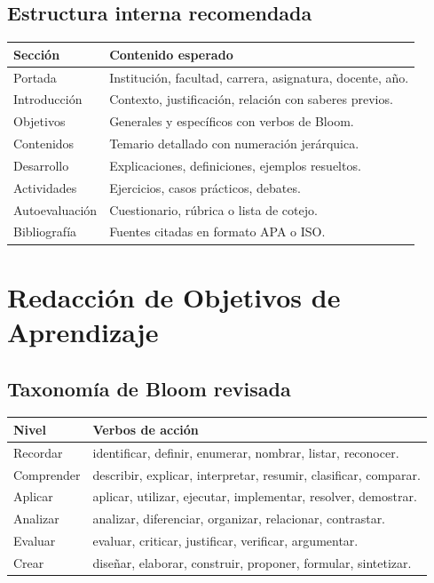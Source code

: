 \documentclass[12pt,a4paper]{article}
\begin{document}
\subsection{Estructura interna recomendada}

\begin{tabular}{|l|l|}
\hline
\textbf{Sección} & \textbf{Contenido esperado} \\
\hline
Portada & Institución, facultad, carrera, asignatura, docente, año. \\
Introducción & Contexto, justificación, relación con saberes previos. \\
Objetivos & Generales y específicos con verbos de Bloom. \\
Contenidos & Temario detallado con numeración jerárquica. \\
Desarrollo & Explicaciones, definiciones, ejemplos resueltos. \\
Actividades & Ejercicios, casos prácticos, debates. \\
Autoevaluación & Cuestionario, rúbrica o lista de cotejo. \\
Bibliografía & Fuentes citadas en formato APA o ISO. \\
\hline
\end{tabular}

\section{Redacción de Objetivos de Aprendizaje}

\subsection{Taxonomía de Bloom revisada}

\begin{tabular}{|l|l|}
\hline
\textbf{Nivel} & \textbf{Verbos de acción} \\
\hline
Recordar & identificar, definir, enumerar, nombrar, listar, reconocer. \\
Comprender & describir, explicar, interpretar, resumir, clasificar, comparar. \\
Aplicar & aplicar, utilizar, ejecutar, implementar, resolver, demostrar. \\
Analizar & analizar, diferenciar, organizar, relacionar, contrastar. \\
Evaluar & evaluar, criticar, justificar, verificar, argumentar. \\
Crear & diseñar, elaborar, construir, proponer, formular, sintetizar. \\
\hline
\end{tabular}
\end{document}
